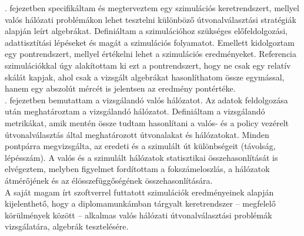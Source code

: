 . fejezetben specifikáltam és megterveztem egy szimulációs keretrendszert, mellyel valós hálózati problémákon lehet tesztelni különböző útvonalválasztási stratégiák alapján leírt algebrákat. Definiáltam a szimulációhoz szükséges előfeldolgozási, adattisztítási lépéseket és magát a szimulációs folyamatot. Emellett kidolgoztam egy pontrendszert, mellyel értékelni lehet a szimulációs eredményeket. Referencia szimulációkkal úgy alakítottam ki ezt a pontrendszert, hogy ne csak egy relatív skálát kapjak, ahol csak a vizsgált algebrákat hasonlíthatom össze egymással, hanem egy abszolút mércét is jelentsen az eredmény pontértéke.\\

. fejezetben bemutattam a vizsgálandó valós hálózatot. Az adatok feldolgozása után meghatároztam a vizsgálandó hálózatot. Definiáltam a vizsgálandó metrikákat, amik mentén össze tudtam hasonlítani a valós- és a policy vezérelt útvonalválasztás által meghatározott útvonalakat és hálózatokat. Minden pontpárra megvizsgálta, az eredeti és a szimulált út különbségeit (távolság, lépésszám). A valós és a szimulált hálózatok statisztikai összehasonlítását is elvégeztem, melyben figyelmet fordítottam a fokszámeloszlás, a hálózatok átmérőjének és az élösszefüggőségének összehasonlítására.\\

A saját magam írt szoftverrel futtatott szimulációk eredményeinek alapján kijelenthető, hogy a diplomamunkámban tárgyalt keretrendszer -- megfelelő körülmények között -- alkalmas valós hálózati útvonalválasztási problémák vizsgálatára, algebrák tesztelésére.
